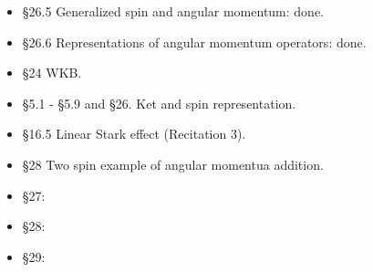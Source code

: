 \begin{itemize}
\item \S 26.5 Generalized spin and angular momentum: done.
\item \S 26.6 Representations of angular momentum operators: done.
\item \S 24 WKB.
\item \S 5.1 - \S 5.9 and \S 26.  Ket and spin representation.
\item \S 16.5 Linear Stark effect (Recitation 3).
\item \S 28 Two spin example of angular momentua addition.
\item \S 27: 
\item \S 28: 
\item \S 29: 
\end{itemize}
